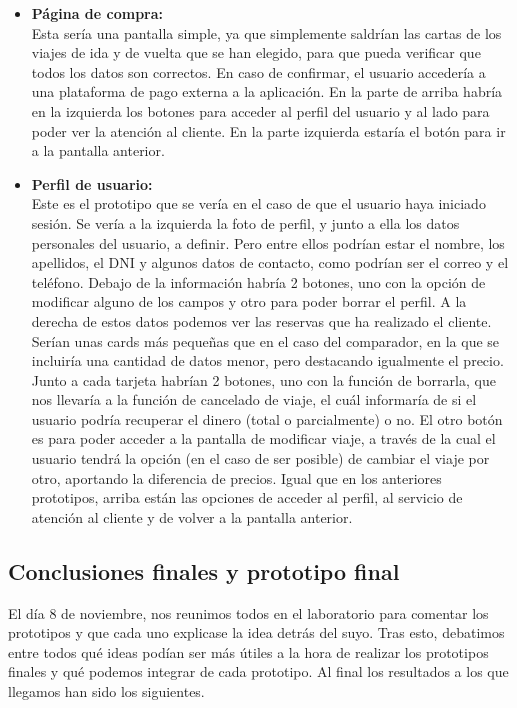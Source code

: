 \begin{itemize}
    \item\textbf{Página de compra:} \\ Esta sería una pantalla simple, ya que simplemente saldrían las cartas de los viajes de ida y de vuelta que se han elegido, para que pueda verificar que todos los datos son correctos. En caso de confirmar, el usuario accedería a una plataforma de pago externa a la aplicación. En la parte de arriba habría en la izquierda los botones para acceder al perfil del usuario y al lado para poder ver la atención al cliente. En la parte izquierda estaría el botón para ir a la pantalla anterior.
    \item\textbf{Perfil de usuario:} \\ Este es el prototipo que se vería en el caso de que el usuario haya iniciado sesión. Se vería a la izquierda la foto de perfil, y junto a ella los datos personales del usuario, a definir. Pero entre ellos podrían estar el nombre, los apellidos, el DNI y algunos datos de contacto, como podrían ser el correo y el teléfono. Debajo de la información habría 2 botones, uno con la opción de modificar alguno de los campos y otro para poder borrar el perfil. A la derecha de estos datos podemos ver las reservas que ha realizado el cliente. Serían unas cards más pequeñas que en el caso del comparador, en la que se incluiría una cantidad de datos menor, pero destacando igualmente el precio. Junto a cada tarjeta habrían 2 botones, uno con la función de borrarla, que nos llevaría a la función de cancelado de viaje, el cuál informaría de si el usuario podría recuperar el dinero (total o parcialmente) o no. El otro botón es para poder acceder a la pantalla de modificar viaje, a través de la cual el usuario tendrá la opción (en el caso de ser posible) de cambiar el viaje por otro, aportando la diferencia de precios. Igual que en los anteriores prototipos, arriba están las opciones de acceder al perfil, al servicio de atención al cliente y de volver a la pantalla anterior.

\end{itemize}

\subsection{Conclusiones finales y prototipo final}

El día 8 de noviembre, nos reunimos todos en el laboratorio para comentar los prototipos y que cada uno explicase
la idea detrás del suyo. Tras esto, debatimos entre todos qué ideas podían ser más útiles a la hora de realizar los prototipos
finales y qué podemos integrar de cada prototipo. Al final los resultados a los que llegamos han sido los siguientes.

